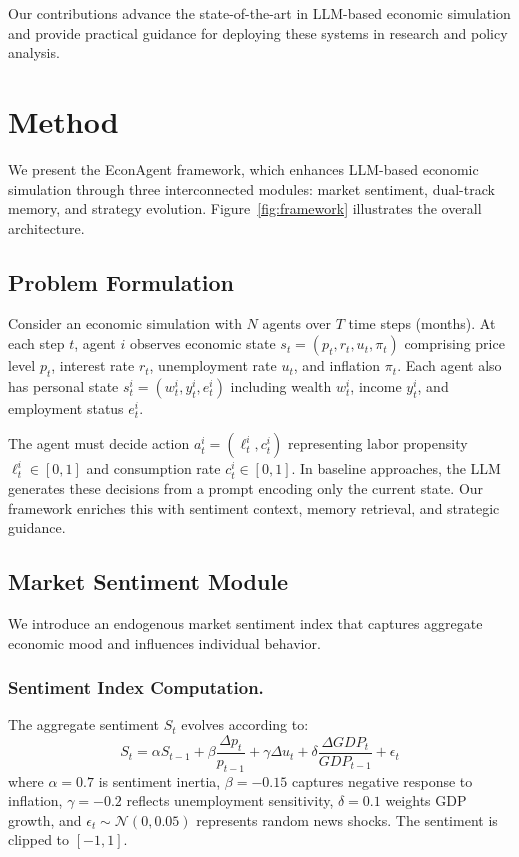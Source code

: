 \documentclass[runningheads]{llncs}
\begin{document}
Our contributions advance the state-of-the-art in LLM-based economic simulation and provide practical guidance for deploying these systems in research and policy analysis.

\section{Method}

We present the EconAgent framework, which enhances LLM-based economic simulation through three interconnected modules: market sentiment, dual-track memory, and strategy evolution. Figure~\ref{fig:framework} illustrates the overall architecture.

\subsection{Problem Formulation}

Consider an economic simulation with $N$ agents over $T$ time steps (months). At each step $t$, agent $i$ observes economic state $s_t = (p_t, r_t, u_t, \pi_t)$ comprising price level $p_t$, interest rate $r_t$, unemployment rate $u_t$, and inflation $\pi_t$. Each agent also has personal state $s_t^i = (w_t^i, y_t^i, e_t^i)$ including wealth $w_t^i$, income $y_t^i$, and employment status $e_t^i$.

The agent must decide action $a_t^i = (\ell_t^i, c_t^i)$ representing labor propensity $\ell_t^i \in [0,1]$ and consumption rate $c_t^i \in [0,1]$. In baseline approaches, the LLM generates these decisions from a prompt encoding only the current state. Our framework enriches this with sentiment context, memory retrieval, and strategic guidance.

\subsection{Market Sentiment Module}

We introduce an endogenous market sentiment index that captures aggregate economic mood and influences individual behavior.

\subsubsection{Sentiment Index Computation.}
The aggregate sentiment $S_t$ evolves according to:
\begin{equation}
S_t = \alpha S_{t-1} + \beta \frac{\Delta p_t}{p_{t-1}} + \gamma \Delta u_t + \delta \frac{\Delta GDP_t}{GDP_{t-1}} + \epsilon_t
\end{equation}
where $\alpha = 0.7$ is sentiment inertia, $\beta = -0.15$ captures negative response to inflation, $\gamma = -0.2$ reflects unemployment sensitivity, $\delta = 0.1$ weights GDP growth, and $\epsilon_t \sim \mathcal{N}(0, 0.05)$ represents random news shocks. The sentiment is clipped to $[-1, 1]$.
\end{document}

